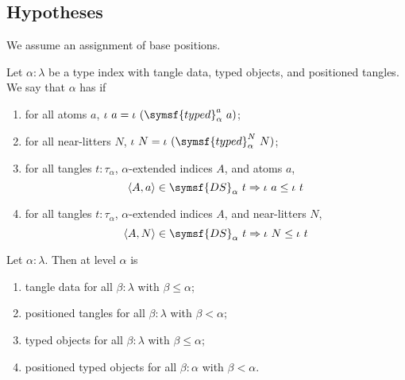 \subsection{Hypotheses}

We assume an assignment of base positions.
\begin{definition}
    \label{def:PositionedTypedObjects}
    Let \( \alpha : \lambda \) be a type index with tangle data, typed objects, and positioned tangles.
    We say that \( \alpha \) has  if
    \begin{enumerate}
        \item for all atoms \( a \), \( \iota\ a = \iota\ (\symsf{typed}^a_\alpha\ a) \);
        \item for all near-litters \( N \), \( \iota\ N = \iota\ (\symsf{typed}^N_\alpha\ N) \);
        \item for all tangles \( t : \tau_\alpha \), \( \alpha \)-extended indices \( A \), and atoms \( a \),
        \[ \langle A, a \rangle \in \symsf{DS}_\alpha\ t \Rightarrow \iota\ a \leq \iota\ t \]
        \item for all tangles \( t : \tau_\alpha \), \( \alpha \)-extended indices \( A \), and near-litters \( N \),
        \[ \langle A, N \rangle \in \symsf{DS}_\alpha\ t \Rightarrow \iota\ N \leq \iota\ t \]
    \end{enumerate}
\end{definition}
\begin{definition}
    Let \( \alpha : \lambda \).
    Then  at level \( \alpha \) is
    \begin{enumerate}
        \item tangle data for all \( \beta : \lambda \) with \( \beta \leq \alpha \);
        \item positioned tangles for all \( \beta : \lambda \) with \( \beta < \alpha \);
        \item typed objects for all \( \beta : \lambda \) with \( \beta \leq \alpha \);
        \item positioned typed objects for all \( \beta : \alpha \) with \( \beta < \alpha \).
    \end{enumerate}
\end{definition}
